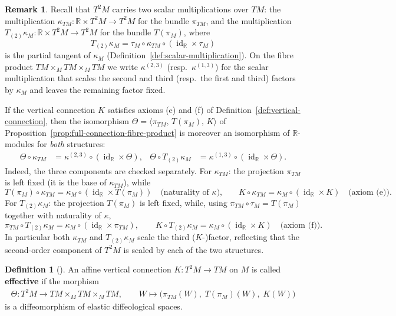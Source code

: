 \documentclass{amsart}
\newcommand{\R}{\mathbb{R}}
\DeclareMathOperator{\id}{id}
\theoremstyle{definition}
\newtheorem{defn}[thm]{Definition}
\newtheorem{rem}[thm]{Remark}
\begin{document}
\begin{rem}\label{rem:theta-bi-scalar}
Recall that $T^2M$ carries two scalar multiplications over $TM$: the
multiplication $\kappa_{TM} \colon \R \times T^2M \to T^2M$ for the bundle
$\pi_{TM}$, and the multiplication $T_{(2)}\kappa_M \colon \R \times T^2M \to T^2M$
for the bundle $T(\pi_M)$, where
\[
  T_{(2)}\kappa_M = \tau_M \circ \kappa_{TM} \circ (\id_{\R} \times \tau_M)
\]
is the partial tangent of $\kappa_M$ (Definition~\ref{def:scalar-multiplication}).
On the fibre product $TM \times_M TM \times_M TM$ we write $\kappa^{(2,3)}$
(resp.\ $\kappa^{(1,3)}$) for the scalar multiplication that scales the second and
third (resp.\ the first and third) factors by $\kappa_M$ and leaves the remaining
factor fixed.

If the vertical connection $K$ satisfies axioms (e) and (f) of
Definition~\ref{def:vertical-connection}, then the isomorphism
$\Theta = \langle \pi_{TM},\, T(\pi_M),\, K \rangle$ of
Proposition~\ref{prop:full-connection-fibre-product} is moreover an isomorphism of
$\R$-modules for \emph{both} structures:
\begin{align*}
  \Theta \circ \kappa_{TM}
    &= \kappa^{(2,3)} \circ (\id_{\R} \times \Theta),
  &
  \Theta \circ T_{(2)}\kappa_M
    &= \kappa^{(1,3)} \circ (\id_{\R} \times \Theta).
\end{align*}
Indeed, the three components are checked separately.
For $\kappa_{TM}$: the projection $\pi_{TM}$ is left fixed (it is the base of
$\kappa_{TM}$), while
\[
  T(\pi_M) \circ \kappa_{TM} = \kappa_M \circ (\id_{\R} \times T(\pi_M))
  \quad\text{(naturality of $\kappa$),}
  \qquad
  K \circ \kappa_{TM} = \kappa_M \circ (\id_{\R} \times K)
  \quad\text{(axiom (e)).}
\]
For $T_{(2)}\kappa_M$: the projection $T(\pi_M)$ is left fixed, while, using
$\pi_{TM} \circ \tau_M = T(\pi_M)$ together with naturality of $\kappa$,
\[
  \pi_{TM} \circ T_{(2)}\kappa_M = \kappa_M \circ (\id_{\R} \times \pi_{TM}),
  \qquad
  K \circ T_{(2)}\kappa_M = \kappa_M \circ (\id_{\R} \times K)
  \quad\text{(axiom (f)).}
\]
In particular both $\kappa_{TM}$ and $T_{(2)}\kappa_M$ scale the third
($K$-)factor, reflecting that the second-order component of $T^2M$ is scaled by
each of the two structures.
\end{rem}

\begin{defn}[{\cite[Definition~6.6, Theorem~8.4]{LW}}]\label{def:effective-vertical-connection}
An affine vertical connection $K \colon T^2M \to TM$ on $M$ is called
\textbf{effective} if the morphism
\begin{align*}
    \Theta \colon T^2M \longrightarrow TM \times_M TM \times_M TM,
    \qquad W \longmapsto \bigl(\pi_{TM}(W),\; T(\pi_M)(W),\; K(W)\bigr)
\end{align*}
is a diffeomorphism of elastic diffeological spaces.
\end{defn}
\end{document}
